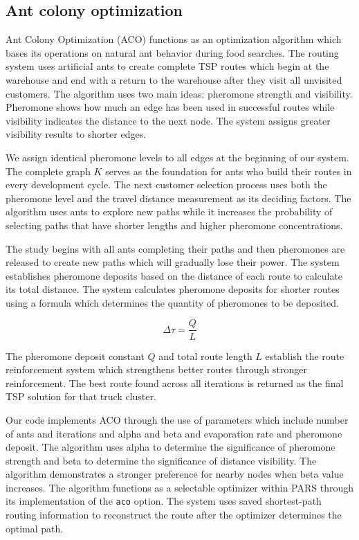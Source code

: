 \documentclass[conference]{IEEEtran}
\begin{document}
\subsection{Ant colony optimization}

Ant Colony Optimization (ACO) functions as an optimization algorithm which bases its operations on natural ant behavior during food searches. The routing system uses artificial ants to create complete TSP routes which begin at the warehouse and end with a return to the warehouse after they visit all unvisited customers. The algorithm uses two main ideas: pheromone strength and visibility. Pheromone shows how much an edge has been used in successful routes while visibility indicates the distance to the next node. The system assigns greater visibility results to shorter edges.

We assign identical pheromone levels to all edges at the beginning of our system. The complete graph $K$ serves as the foundation for ants who build their routes in every development cycle. The next customer selection process uses both the pheromone level and the travel distance measurement as its deciding factors. The algorithm uses ants to explore new paths while it increases the probability of selecting paths that have shorter lengths and higher pheromone concentrations.

The study begins with all ants completing their paths and then pheromones are released to create new paths which will gradually lose their power. The system establishes pheromone deposits based on the distance of each route to calculate its total distance. The system calculates pheromone deposits for shorter routes using a formula which determines the quantity of pheromones to be deposited.

\[
    \Delta \tau = \frac{Q}{L}
\]

The pheromone deposit constant $Q$ and total route length $L$ establish the route reinforcement system which strengthens better routes through stronger reinforcement. The best route found across all iterations is returned as the final TSP solution for that truck cluster.

Our code implements ACO through the use of parameters which include number of ants and iterations and alpha and beta and evaporation rate and pheromone deposit. The algorithm uses alpha to determine the significance of pheromone strength and beta to determine the significance of distance visibility. The algorithm demonstrates a stronger preference for nearby nodes when beta value increases. The algorithm functions as a selectable optimizer within PARS through its implementation of the \texttt{aco} option. The system uses saved shortest-path routing information to reconstruct the route after the optimizer determines the optimal path.
\end{document}
